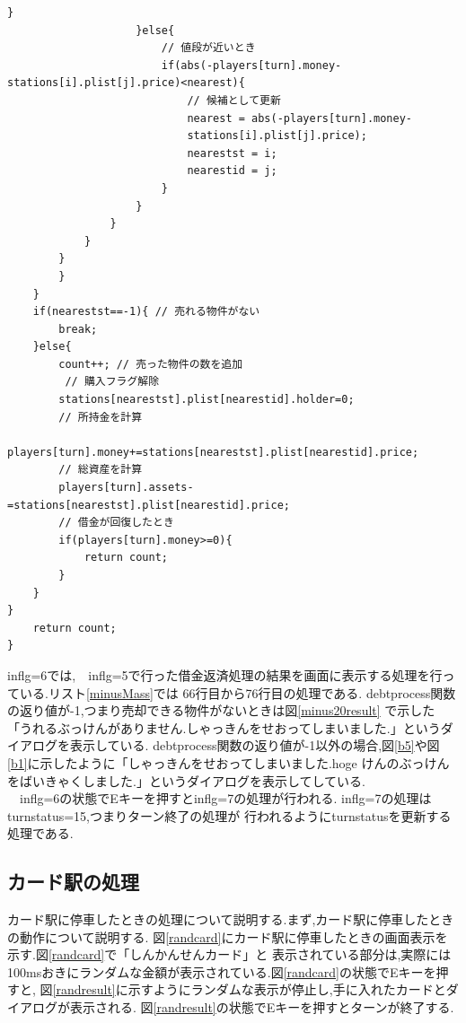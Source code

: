 \documentclass[a4j]{jarticle}
\begin{document}
\begin{lstlisting}[basicstyle=\ttfamily\footnotesize, frame=single,label=sale,caption=sale関数]
                    }
                    }else{
                        // 値段が近いとき
                        if(abs(-players[turn].money-stations[i].plist[j].price)<nearest){
                            // 候補として更新
                            nearest = abs(-players[turn].money-
                            stations[i].plist[j].price);
                            nearestst = i;
                            nearestid = j;                                 
                        }
                    }
                }
            }
        }
        }
    }
    if(nearestst==-1){ // 売れる物件がない
        break;
    }else{
        count++; // 売った物件の数を追加
         // 購入フラグ解除
        stations[nearestst].plist[nearestid].holder=0;
        // 所持金を計算
        players[turn].money+=stations[nearestst].plist[nearestid].price;
        // 総資産を計算
        players[turn].assets-=stations[nearestst].plist[nearestid].price;
        // 借金が回復したとき
        if(players[turn].money>=0){
            return count;
        }
    }      
}
    return count;
}
        \end{lstlisting}

        inflg=6では,　inflg=5で行った借金返済処理の結果を画面に表示する処理を行っている.リスト\ref{minusMass}では
        66行目から76行目の処理である. debtprocess関数の返り値が-1,つまり売却できる物件がないときは図\ref{minus20result}
        で示した「うれるぶっけんがありません.しゃっきんをせおってしまいました.」というダイアログを表示している.
        debtprocess関数の返り値が-1以外の場合,図\ref{b5}や図\ref{b1}に示したように「しゃっきんをせおってしまいました.hoge
        けんのぶっけんをばいきゃくしました.」というダイアログを表示してしている.\\
        　inflg=6の状態でEキーを押すとinflg=7の処理が行われる. inflg=7の処理はturnstatus=15,つまりターン終了の処理が
        行われるようにturnstatusを更新する処理である.

    \subsection{カード駅の処理}
    カード駅に停車したときの処理について説明する.まず,カード駅に停車したときの動作について説明する.
    図\ref{randcard}にカード駅に停車したときの画面表示を示す.図\ref{randcard}で「しんかんせんカード」と
    表示されている部分は,実際には100msおきにランダムな金額が表示されている.図\ref{randcard}の状態でEキーを押すと,
    図\ref{randresult}に示すようにランダムな表示が停止し,手に入れたカードとダイアログが表示される.
    図\ref{randresult}の状態でEキーを押すとターンが終了する.
\end{document}
